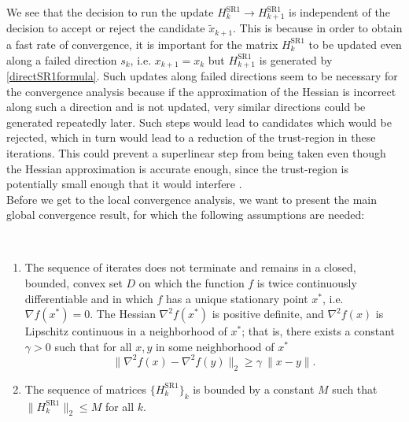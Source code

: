 We see that the decision to run the update $H^{\mathrm{SR1}}_k \rightarrow H^{\mathrm{SR1}}_{k+1}$ is independent of the decision to accept or reject the candidate $\widetilde{x}_{k+1}$. This is because in order to obtain a fast rate of convergence, it is important for the matrix $H^{\mathrm{SR1}}_k$ to be updated even along a failed direction $s_k$, i.e. $x_{k+1} = x_k$ but $H^{\mathrm{SR1}}_{k+1}$ is generated by \cref{directSR1formula}. Such updates along failed directions seem to be necessary for the convergence analysis because if the approximation of the Hessian is incorrect along such a direction and is not updated, very similar directions could be generated repeatedly later. Such steps would lead to candidates which would be rejected, which in turn would lead to a reduction of the trust-region in these iterations. This could prevent a superlinear step from being taken even though the Hessian approximation is accurate enough, since the trust-region is potentially small enough that it would interfere \cite[p.~1028]{ByrdKhalfanSchnabel:1996}. \\
Before we get to the local convergence analysis, we want to present the main global convergence result, for which the following assumptions are needed:

\begin{assumption}\label{AssumptionsGlobalConvergence} \ \\[-1.5\baselineskip]
    \begin{enumerate}
        \item The sequence of iterates does not terminate and remains in a closed, bounded, convex set $D$ on which the function $f$ is twice continuously differentiable and in which $f$ has a unique stationary point $x^*$, i.e. $\nabla f(x^*) = 0$. The Hessian $\nabla^2 f(x^*)$ is positive definite, and $\nabla^2 f(x)$ is Lipschitz continuous in a neighborhood of $x^*$; that is, there exists a constant $\gamma > 0$ such that for all $x, y$ in some neighborhood of $x^*$ \begin{equation*} \lVert \nabla^2 f(x) - \nabla^2 f(y) \rVert_2 \geq \gamma \ \lVert x - y \rVert. \end{equation*}
        \item The sequence of matrices $\{ H^{\mathrm{SR1}}_k \}_k$ is bounded by a constant $M$ such that $\lVert H^{\mathrm{SR1}}_k \rVert_2 \leq M$ for all $k$.
    \end{enumerate}
\end{assumption}

